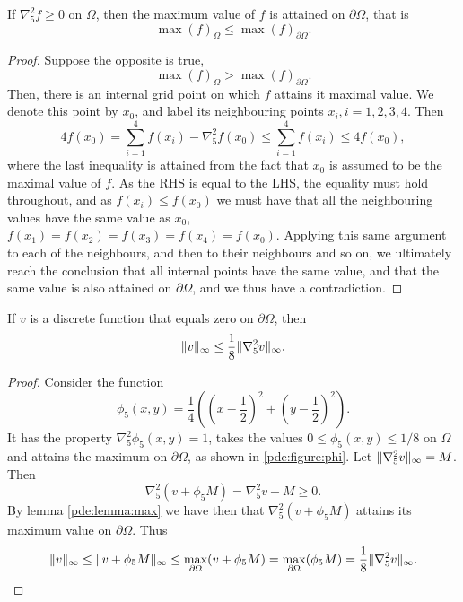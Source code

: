 \begin{lemma}\label{pde:lemma:max}
If $\nabla_5^2 f \geq 0$ on $\Omega$, then the maximum value of $f$ is attained on $\partial \Omega$, that is
$$
\max(f)_\Omega \leq \max(f)_{\partial \Omega}.
$$
\end{lemma}
\begin{proof}
Suppose the opposite is true,
$$
\max(f)_\Omega > \max(f)_{\partial \Omega}.
$$
Then, there is an internal grid point on which $f$ attains it maximal value.
We denote this point by $x_0$, and label its neighbouring points $x_i, i = 1,2,3,4$.
Then
$$
4f(x_0) = \sum_{i=1}^4 f(x_i) - \nabla_5^2 f(x_0) \leq \sum_{i=1}^4 f(x_i) \leq 4 f(x_0),
$$
where the last inequality is attained from the fact that $x_0$ is assumed to be the maximal value of $f$.
As the RHS is equal to the LHS, the equality must hold throughout, and as $f(x_i) \leq f(x_0)$ we must have that all the neighbouring values have the same value as $x_0$, $f(x_1) = f(x_2) = f(x_3) = f(x_4) = f(x_0)$.
Applying this same argument to each of the neighbours, and then to their neighbours and so on, we ultimately reach the conclusion that all internal points have the same value, and that the same value is also attained on $\partial \Omega$, and we thus have a contradiction.
\end{proof}

\begin{lemma}\label{pde:lemma:bound}
If $v$ is a discrete function that equals zero on $\partial \Omega$, then
$$
\lVert v \rVert_\infty \leq \frac18 \lVert \nabla_5^2 v \rVert_\infty.
$$
\end{lemma}
\begin{proof}
Consider the function
\begin{equation}
\phi_5(x,y) = \frac14 \left(\left(x-\frac12\right)^2 + \left(y-\frac12\right)^2\right).
\label{pde:equation:phi5}
\end{equation}
It has the property $\nabla_5^2 \phi_5(x,y) = 1$, takes the values $0 \leq \phi_5(x,y) \leq 1/8$ on $\Omega$ and attains the maximum on $\partial \Omega$, as shown in \cref{pde:figure:phi}.
Let $\lVert \nabla_5^2 v \rVert_\infty = M$.
Then
$$
\nabla_5^2 (v + \phi_5 M) = \nabla_5^2 v +  M \geq 0.
$$
By lemma \ref{pde:lemma:max} we have then that $\nabla_5^2 (v + \phi_5 M)$ attains its maximum value on $\partial \Omega$.
Thus
$$
\lVert v \rVert_\infty
\leq \lVert v + \phi_5 M \rVert_\infty
\leq \max_{\partial \Omega}(v + \phi_5 M)
= \max_{\partial\Omega} (\phi_5 M)
= \frac18 \lVert \nabla_5^2 v \rVert_\infty.
$$
\end{proof}

